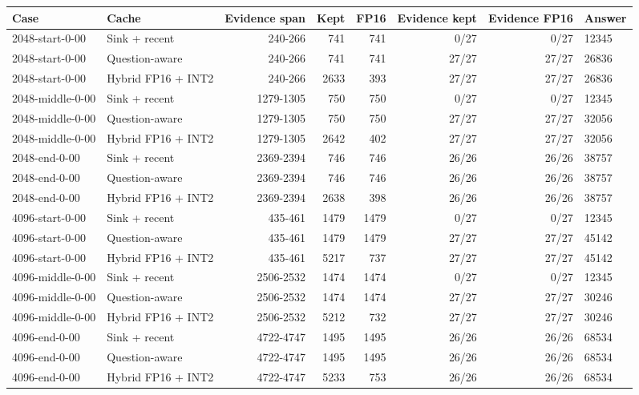 \scriptsize
\setlength{\tabcolsep}{3.5pt}
\label{tab:t2cmasks}
\begin{adjustbox}{max width=\linewidth}
\begin{tabular}{llrrrrrl}
\toprule
Case & Cache & Evidence span & Kept & FP16 & Evidence kept & Evidence FP16 & Answer \\
\midrule
2048-start-0-00 & Sink + recent & 240-266 & 741 & 741 & 0/27 & 0/27 & 12345 \\
2048-start-0-00 & Question-aware & 240-266 & 741 & 741 & 27/27 & 27/27 & 26836 \\
2048-start-0-00 & Hybrid FP16 + INT2 & 240-266 & 2633 & 393 & 27/27 & 27/27 & 26836 \\
2048-middle-0-00 & Sink + recent & 1279-1305 & 750 & 750 & 0/27 & 0/27 & 12345 \\
2048-middle-0-00 & Question-aware & 1279-1305 & 750 & 750 & 27/27 & 27/27 & 32056 \\
2048-middle-0-00 & Hybrid FP16 + INT2 & 1279-1305 & 2642 & 402 & 27/27 & 27/27 & 32056 \\
2048-end-0-00 & Sink + recent & 2369-2394 & 746 & 746 & 26/26 & 26/26 & 38757 \\
2048-end-0-00 & Question-aware & 2369-2394 & 746 & 746 & 26/26 & 26/26 & 38757 \\
2048-end-0-00 & Hybrid FP16 + INT2 & 2369-2394 & 2638 & 398 & 26/26 & 26/26 & 38757 \\
4096-start-0-00 & Sink + recent & 435-461 & 1479 & 1479 & 0/27 & 0/27 & 12345 \\
4096-start-0-00 & Question-aware & 435-461 & 1479 & 1479 & 27/27 & 27/27 & 45142 \\
4096-start-0-00 & Hybrid FP16 + INT2 & 435-461 & 5217 & 737 & 27/27 & 27/27 & 45142 \\
4096-middle-0-00 & Sink + recent & 2506-2532 & 1474 & 1474 & 0/27 & 0/27 & 12345 \\
4096-middle-0-00 & Question-aware & 2506-2532 & 1474 & 1474 & 27/27 & 27/27 & 30246 \\
4096-middle-0-00 & Hybrid FP16 + INT2 & 2506-2532 & 5212 & 732 & 27/27 & 27/27 & 30246 \\
4096-end-0-00 & Sink + recent & 4722-4747 & 1495 & 1495 & 26/26 & 26/26 & 68534 \\
4096-end-0-00 & Question-aware & 4722-4747 & 1495 & 1495 & 26/26 & 26/26 & 68534 \\
4096-end-0-00 & Hybrid FP16 + INT2 & 4722-4747 & 5233 & 753 & 26/26 & 26/26 & 68534 \\
\bottomrule
\end{tabular}
\end{adjustbox}
